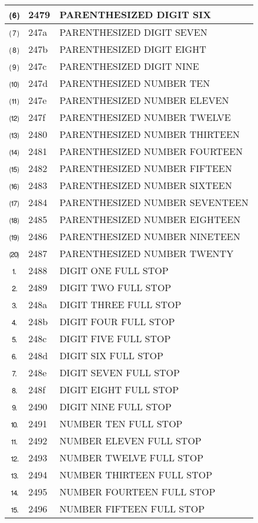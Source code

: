 \documentclass[12pt,letterpaper,openany]{book}
\begin{document}
\begin{center}
\begin{supertabular}{|m{0.25in}|m{0.5in}|m{4in}|}
			⑹ & 2479 & PARENTHESIZED DIGIT SIX\\\hline
			⑺ & 247a & PARENTHESIZED DIGIT SEVEN\\\hline
			⑻ & 247b & PARENTHESIZED DIGIT EIGHT\\\hline
			⑼ & 247c & PARENTHESIZED DIGIT NINE\\\hline
			⑽ & 247d & PARENTHESIZED NUMBER TEN\\\hline
			⑾ & 247e & PARENTHESIZED NUMBER ELEVEN\\\hline
			⑿ & 247f & PARENTHESIZED NUMBER TWELVE\\\hline
			⒀ & 2480 & PARENTHESIZED NUMBER THIRTEEN\\\hline
			⒁ & 2481 & PARENTHESIZED NUMBER FOURTEEN\\\hline
			⒂ & 2482 & PARENTHESIZED NUMBER FIFTEEN\\\hline
			⒃ & 2483 & PARENTHESIZED NUMBER SIXTEEN\\\hline
			⒄ & 2484 & PARENTHESIZED NUMBER SEVENTEEN\\\hline
			⒅ & 2485 & PARENTHESIZED NUMBER EIGHTEEN\\\hline
			⒆ & 2486 & PARENTHESIZED NUMBER NINETEEN\\\hline
			⒇ & 2487 & PARENTHESIZED NUMBER TWENTY\\\hline
			⒈ & 2488 & DIGIT ONE FULL STOP\\\hline
			⒉ & 2489 & DIGIT TWO FULL STOP\\\hline
			⒊ & 248a & DIGIT THREE FULL STOP\\\hline
			⒋ & 248b & DIGIT FOUR FULL STOP\\\hline
			⒌ & 248c & DIGIT FIVE FULL STOP\\\hline
			⒍ & 248d & DIGIT SIX FULL STOP\\\hline
			⒎ & 248e & DIGIT SEVEN FULL STOP\\\hline
			⒏ & 248f & DIGIT EIGHT FULL STOP\\\hline
			⒐ & 2490 & DIGIT NINE FULL STOP\\\hline
			⒑ & 2491 & NUMBER TEN FULL STOP\\\hline
			⒒ & 2492 & NUMBER ELEVEN FULL STOP\\\hline
			⒓ & 2493 & NUMBER TWELVE FULL STOP\\\hline
			⒔ & 2494 & NUMBER THIRTEEN FULL STOP\\\hline
			⒕ & 2495 & NUMBER FOURTEEN FULL STOP\\\hline
			⒖ & 2496 & NUMBER FIFTEEN FULL STOP\\\hline

\end{supertabular}
\end{center}
\end{document}
